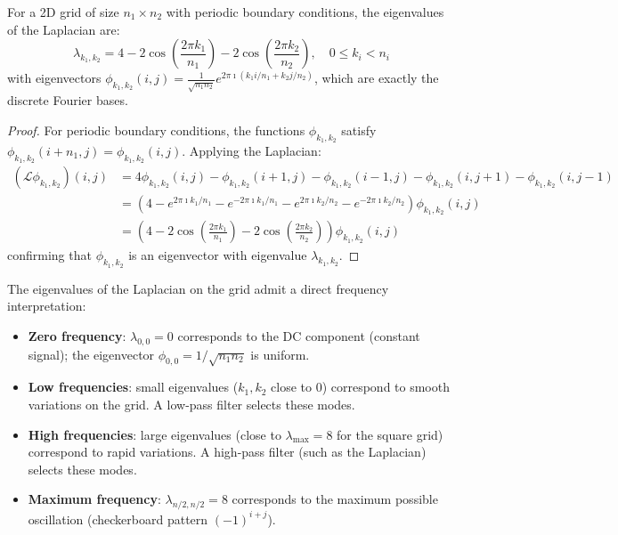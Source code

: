 \begin{proposition}\label{prop:eigenvalores_laplaciano_grilla}
For a 2D grid of size $n_1 \times n_2$ with periodic boundary conditions, the eigenvalues of the Laplacian are:
\begin{equation}
\lambda_{k_1,k_2} = 4 - 2\cos\!\left(\frac{2\pi k_1}{n_1}\right) - 2\cos\!\left(\frac{2\pi k_2}{n_2}\right), \quad 0 \leq k_i < n_i
\end{equation}
with eigenvectors $\phi_{k_1,k_2}(i,j) = \frac{1}{\sqrt{n_1 n_2}} e^{2\pi \imath(k_1 i/n_1 + k_2 j/n_2)}$, which are exactly the discrete Fourier bases.
\end{proposition}

\begin{proof}
For periodic boundary conditions, the functions $\phi_{k_1,k_2}$ satisfy $\phi_{k_1,k_2}(i + n_1, j) = \phi_{k_1,k_2}(i,j)$. Applying the Laplacian:
\begin{align}
(\mathcal{L}\phi_{k_1,k_2})(i,j) &= 4\phi_{k_1,k_2}(i,j) - \phi_{k_1,k_2}(i+1,j) - \phi_{k_1,k_2}(i-1,j) - \phi_{k_1,k_2}(i,j+1) - \phi_{k_1,k_2}(i,j-1) \\
&= \left(4 - e^{2\pi \imath k_1/n_1} - e^{-2\pi \imath k_1/n_1} - e^{2\pi \imath k_2/n_2} - e^{-2\pi \imath k_2/n_2}\right)\phi_{k_1,k_2}(i,j) \\
&= \left(4 - 2\cos\!\left(\frac{2\pi k_1}{n_1}\right) - 2\cos\!\left(\frac{2\pi k_2}{n_2}\right)\right)\phi_{k_1,k_2}(i,j)
\end{align}
confirming that $\phi_{k_1,k_2}$ is an eigenvector with eigenvalue $\lambda_{k_1,k_2}$.
\end{proof}

\begin{remark}\label{rem:interpretacion_frecuencial_eigenvalores}
The eigenvalues of the Laplacian on the grid admit a direct frequency interpretation:
\begin{itemize}
    \item \textbf{Zero frequency}: $\lambda_{0,0} = 0$ corresponds to the DC component (constant signal); the eigenvector $\phi_{0,0} = 1/\sqrt{n_1 n_2}$ is uniform.
    \item \textbf{Low frequencies}: small eigenvalues ($k_1, k_2$ close to 0) correspond to smooth variations on the grid. A low-pass filter selects these modes.
    \item \textbf{High frequencies}: large eigenvalues (close to $\lambda_{\max} = 8$ for the square grid) correspond to rapid variations. A high-pass filter (such as the Laplacian) selects these modes.
    \item \textbf{Maximum frequency}: $\lambda_{n/2,n/2} = 8$ corresponds to the maximum possible oscillation (checkerboard pattern $(-1)^{i+j}$).
\end{itemize}
\end{remark}

